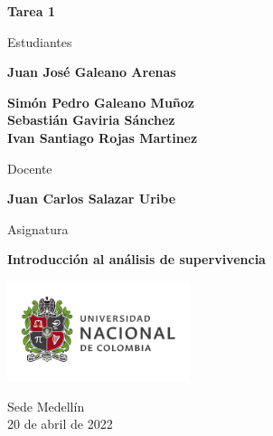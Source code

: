 \begin{titlepage}
   \Large{
   \begin{center}
       \vspace*{1cm}

       \textbf{Tarea 1}

            
       \vspace{1.1cm}
       
       Estudiantes
       
       \vspace{0.5cm}
        
	\textbf{Juan José Galeano Arenas}        

       \textbf{Simón Pedro Galeano Muñoz} \\

	\textbf{Sebastián Gaviria Sánchez} \\

	\textbf{Ivan Santiago Rojas Martinez}

              \vspace{1cm}
       
       Docente
       
       \vspace{0.5cm}

       \textbf{Juan Carlos Salazar Uribe}
       
       \vspace{0.4cm}

       \vspace{1.4cm}
       
       Asignatura
       
       \vspace{0.5cm}

       \textbf{Introducción al análisis de supervivencia}

       \vfill

            
       \vspace{0.4cm}
     
       \includegraphics[width=0.4\textwidth]{logounal.png}
            
       Sede Medellín\\
       20 de abril de 2022
       
   \end{center}
   }
\end{titlepage}
